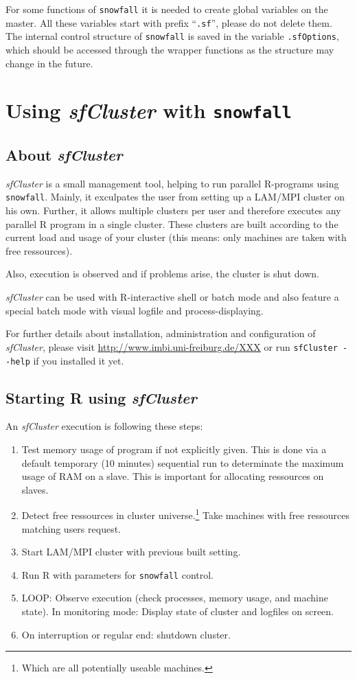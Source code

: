 \documentclass[10pt,oneside]{article}
\begin{document}
For some functions of \texttt{snowfall} it is needed to create global variables
on the master. All these variables start with prefix ``\texttt{.sf}'', please do
not delete them. The internal control structure of \texttt{snowfall} is saved in
the variable \texttt{.sfOptions}, which should be accessed through the wrapper
functions as the structure may change in the future.\section{Using \emph{sfCluster} with \texttt{snowfall}}
\subsection{About \emph{sfCluster}}
\emph{sfCluster} is a small management tool, helping to run parallel R-programs
using \texttt{snowfall}. Mainly, it exculpates the user from setting up a LAM/MPI
cluster on his own. Further, it allows multiple clusters per user and
therefore executes any parallel R program in a single cluster. These clusters
are built according to the current load and usage of your cluster (this
means: only machines are taken with free ressources).

Also, execution is observed and if problems arise, the cluster is shut down.

\emph{sfCluster} can be used with R-interactive shell or batch mode and also feature
a special batch mode with visual logfile and process-displaying.

For further details about installation, administration and configuration of
\emph{sfCluster}, please visit \url{http://www.imbi.uni-freiburg.de/XXX} or
run \texttt{sfCluster {-}{-}help} if you installed it yet.

\subsection{Starting R using \emph{sfCluster}}
An \emph{sfCluster} execution is following these steps:

\begin{enumerate}
 \item Test memory usage of program if not explicitly given. This is done via
       a default temporary (10 minutes) sequential run to determinate the maximum usage
       of RAM on a slave.
       This is important for allocating ressources on slaves.
 \item Detect free ressources in cluster universe.\footnote{Which are all potentially
       useable machines.} Take machines with free ressources matching users
       request.
 \item Start LAM/MPI cluster with previous built setting.
 \item Run R with parameters for \texttt{snowfall} control.
 \item LOOP: Observe execution (check processes, memory usage, and machine state). In
       monitoring mode: Display state of cluster and logfiles on screen.
 \item On interruption or regular end: shutdown cluster.
\end{enumerate}
\end{document}

